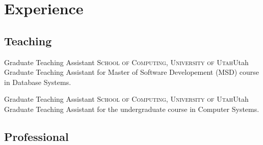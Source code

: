 \documentclass[11pt,a4paper,sans]{moderncv}
\begin{document}

\section{Experience}

    \subsection{Teaching}

                {Graduate Teaching Assistant}
                {\textsc{School of Computing, University of Utah}}{Utah}
                {}
                {
                    Graduate Teaching Assistant for Master of Software
                    Developement (MSD) course in Database Systems.
                }

                {Graduate Teaching Assistant}
                {\textsc{School of Computing, University of Utah}}{Utah}
                {}
                {
                    Graduate Teaching Assistant for the undergraduate course in
                    Computer Systems.
                }


    \subsection{Professional}
\end{document}
